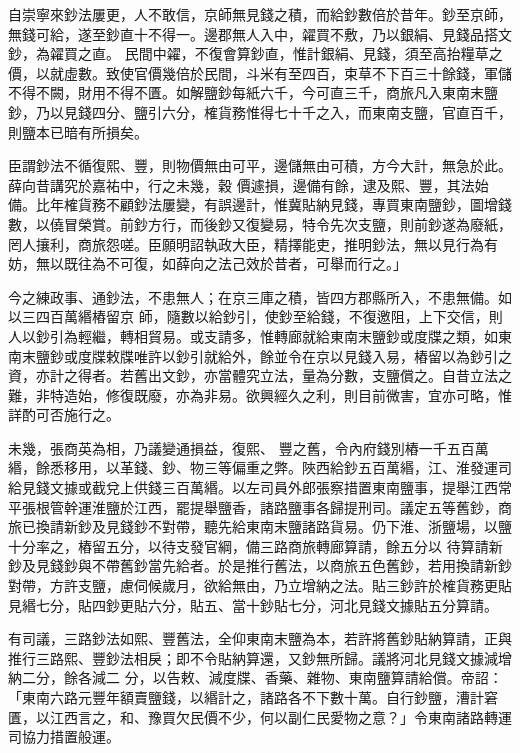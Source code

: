 \begin{pinyinscope}
 自崇寧來鈔法屢更，人不敢信，京師無見錢之積，而給鈔數倍於昔年。鈔至京師，無錢可給，遂至鈔直十不得一。邊郡無人入中，糴買不敷，乃以銀絹、見錢品搭文鈔，為糴買之直。
 民間中糴，不復會算鈔直，惟計銀絹、見錢，須至高抬糧草之價，以就虛數。致使官價幾倍於民間，斗米有至四百，束草不下百三十餘錢，軍儲不得不闕，財用不得不匱。如解鹽鈔每紙六千，今可直三千，商旅凡入東南末鹽鈔，乃以見錢四分、鹽引六分，榷貨務惟得七十千之入，而東南支鹽，官直百千，則鹽本已暗有所損矣。



 臣謂鈔法不循復熙、豐，則物價無由可平，邊儲無由可積，方今大計，無急於此。薛向昔講究於嘉祐中，行之未幾，穀
 價遽損，邊備有餘，逮及熙、豐，其法始備。比年榷貨務不顧鈔法屢變，有誤邊計，惟冀貼納見錢，專買東南鹽鈔，圖增錢數，以僥冒榮賞。前鈔方行，而後鈔又復變易，特令先次支鹽，則前鈔遂為廢紙，罔人攘利，商旅怨嗟。臣願明詔執政大臣，精擇能吏，推明鈔法，無以見行為有妨，無以既往為不可復，如薛向之法己效於昔者，可舉而行之。」



 今之練政事、通鈔法，不患無人；在京三庫之積，皆四方郡縣所入，不患無備。如以三四百萬緡樁留京
 師，隨數以給鈔引，使鈔至給錢，不復邀阻，上下交信，則人以鈔引為輕繼，轉相貿易。或支請多，惟轉廊就給東南末鹽鈔或度牒之類，如東南末鹽鈔或度牒敕牒唯許以鈔引就給外，餘並令在京以見錢入易，樁留以為鈔引之資，亦計之得者。若舊出文鈔，亦當體究立法，量為分數，支鹽償之。自昔立法之難，非特造始，修復既廢，亦為非易。欲興經久之利，則目前微害，宜亦可略，惟詳酌可否施行之。



 未幾，張商英為相，乃議變通損益，復熙、
 豐之舊，令內府錢別樁一千五百萬緡，餘悉移用，以革錢、鈔、物三等偏重之弊。陜西給鈔五百萬緡，江、淮發運司給見錢文據或截兌上供錢三百萬緡。以左司員外郎張察措置東南鹽事，提舉江西常平張根管幹運淮鹽於江西，罷提舉鹽香，諸路鹽事各歸提刑司。議定五等舊鈔，商旅已換請新鈔及見錢鈔不對帶，聽先給東南末鹽諸路貨易。仍下淮、浙鹽場，以鹽十分率之，樁留五分，以待支發官綱，備三路商旅轉廊算請，餘五分以
 待算請新鈔及見錢鈔與不帶舊鈔當先給者。於是推行舊法，以商旅五色舊鈔，若用換請新鈔對帶，方許支鹽，慮伺候歲月，欲給無由，乃立增納之法。貼三鈔許於榷貨務更貼見緡七分，貼四鈔更貼六分，貼五、當十鈔貼七分，河北見錢文據貼五分算請。



 有司議，三路鈔法如熙、豐舊法，全仰東南末鹽為本，若許將舊鈔貼納算請，正與推行三路熙、豐鈔法相戾；即不令貼納算還，又鈔無所歸。議將河北見錢文據減增納二分，餘各減二
 分，以告敕、減度牒、香藥、雜物、東南鹽算請給償。帝詔：「東南六路元豐年額賣鹽錢，以緡計之，諸路各不下數十萬。自行鈔鹽，漕計窘匱，以江西言之，和、豫買欠民價不少，何以副仁民愛物之意？」令東南諸路轉運司協力措置般運。




\end{pinyinscope}
